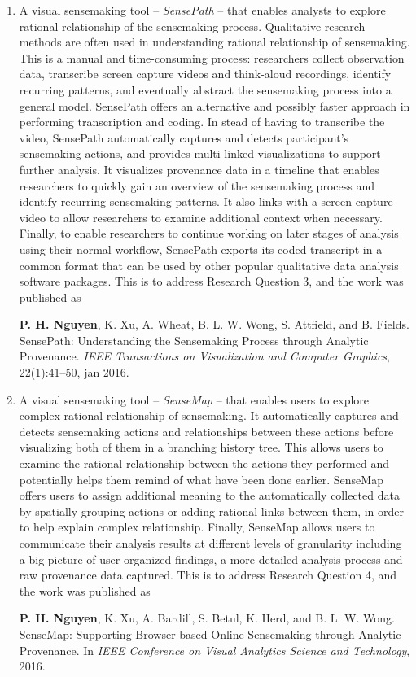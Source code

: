 \begin{enumerate}
	\item A visual sensemaking tool -- \emph{SensePath} -- that enables analysts to explore rational relationship of the sensemaking process. Qualitative research methods are often used in understanding rational relationship of sensemaking. This is a manual and time-consuming process: researchers collect observation data, transcribe screen capture videos and think-aloud recordings, identify recurring patterns, and eventually abstract the sensemaking process into a general model. SensePath offers an alternative and possibly faster approach in performing transcription and coding. In stead of having to transcribe the video, SensePath automatically captures and detects participant's sensemaking actions, and provides multi-linked visualizations to support further analysis. It visualizes provenance data in a timeline that enables researchers to quickly gain an overview of the sensemaking process and identify recurring sensemaking patterns. It also links with a screen capture video to allow researchers to examine  additional context when necessary. Finally, to enable researchers to continue working on later stages of analysis using their normal workflow, SensePath exports its coded transcript in a common format that can be used by other popular qualitative data analysis software packages. This is to address Research Question 3, and the work was published as
	
	\qquad\textbf{P. H. Nguyen}, K. Xu, A. Wheat, B. L. W. Wong, S. Attfield, and B. Fields. SensePath: Understanding the Sensemaking Process through Analytic Provenance. \textit{IEEE Transactions on Visualization and Computer Graphics}, 22(1):41--50, jan 2016. 
	
	\item A visual sensemaking tool -- \emph{SenseMap} -- that enables users to explore complex rational relationship of sensemaking. It automatically captures and detects sensemaking actions and relationships between these actions before visualizing both of them in a branching history tree. This allows users to examine the rational relationship between the actions they performed and potentially helps them remind of what have been done earlier. SenseMap offers users to assign additional meaning to the automatically collected data by spatially grouping actions or adding rational links between them, in order to help explain complex relationship. Finally, SenseMap allows users to communicate their analysis results at different levels of granularity including a big picture of user-organized findings, a more detailed analysis process and raw provenance data captured. This is to address Research Question 4, and the work was published as 

	\qquad\textbf{P. H. Nguyen}, K. Xu, A. Bardill, S. Betul, K. Herd, and B. L. W. Wong. SenseMap: Supporting Browser-based Online Sensemaking through Analytic Provenance. In \textit{IEEE Conference on Visual Analytics Science and Technology}, 2016.
\end{enumerate}

